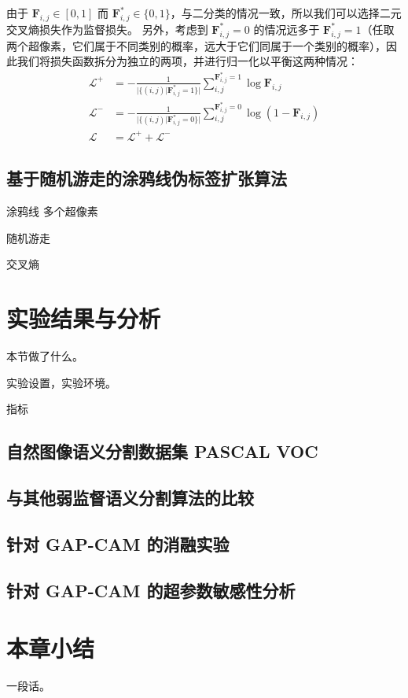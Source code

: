 由于 $\mathbf{F}_{i,j} \in [0,1]$ 而 $\mathbf{F}^{*}_{i,j} \in \{0,1\}$，与二分类的情况一致，所以我们可以选择二元交叉熵损失作为监督损失。
另外，考虑到 $\mathbf{F}^{*}_{i,j} = 0$ 的情况远多于 $\mathbf{F}^{*}_{i,j} = 1$（任取两个超像素，它们属于不同类别的概率，远大于它们同属于一个类别的概率），因此我们将损失函数拆分为独立的两项，并进行归一化以平衡这两种情况：
\begin{align}
\mathcal{L}^{+} &= -\frac{1}{\vert \{ (i,j) \vert \mathbf{F}^{*}_{i,j} = 1 \} \vert} \sum_{i,j}^{\mathbf{F}^{*}_{i,j} = 1} \log \mathbf{F}_{i,j}\\
\mathcal{L}^{-} &= -\frac{1}{\vert \{ (i,j) \vert \mathbf{F}^{*}_{i,j} = 0 \} \vert} \sum_{i,j}^{\mathbf{F}^{*}_{i,j} = 0} \log (1 - \mathbf{F}_{i,j})\\
\mathcal{L} &= \mathcal{L}^{+} + \mathcal{L}^{-}
\end{align}
\subsection{基于随机游走的涂鸦线伪标签扩张算法}
涂鸦线 \rightarrow 多个超像素
\par
随机游走
\par
交叉熵
\section{实验结果与分析}
本节做了什么。
\par
实验设置，实验环境。
\par
指标
\subsection{自然图像语义分割数据集 PASCAL VOC}
\subsection{与其他弱监督语义分割算法的比较}
\subsection{针对 GAP-CAM 的消融实验}
\subsection{针对 GAP-CAM 的超参数敏感性分析}
\section{本章小结}
一段话。
